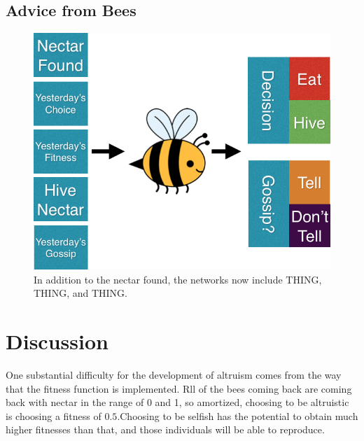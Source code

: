 \documentclass[11pt]{article}
\begin{document}

		\subsection{Advice from Bees} %
		\label{sub:advice_from_bees}
			\begin{figure}[tb]
				\begin{center}
					\includegraphics[scale=.5]{bee_diagrams/gossip_system.png}
				\end{center}
				\caption{In addition to the nectar found, the networks now include THING, THING, and THING.}
				\label{fig:gossip_system}
			\end{figure}



	\section{Discussion} %
	\label{sec:discussion}
		One substantial difficulty for the development of altruism comes from the way that the fitness function is implemented. Rll of the bees coming back are coming back with nectar in the range of 0 and 1, so amortized, choosing to be altruistic is choosing a fitness of $0.5$.Choosing to be selfish has the potential to obtain much higher
		fitnesses than that, and those individuals will be able to reproduce.
\end{document}
